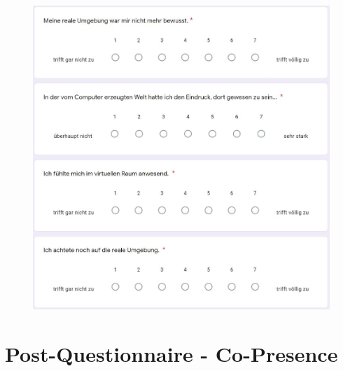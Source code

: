 \documentclass[a4paper,11pt]{article}%
\renewcommand{\\}{\vspace*{0.5\baselineskip} \newline}
\begin{document}
	\begin{figure}[H]
	\centering
		\begin{footnotesize}
			\includegraphics[scale=0.6]{Abbildungen/Fragebogen/Post-Questionnaire/PQP3}
		\end{footnotesize}
	\end{figure}	

\newpage
\section{Post-Questionnaire - Co-Presence}			
\label{Post-Questionnaire - Co-Presence}		
\end{document}
